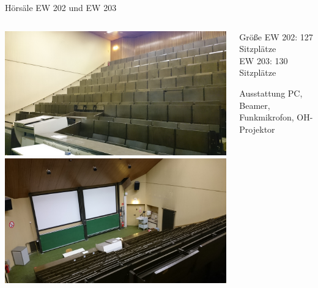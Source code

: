 \documentclass[compress,]{beamer}
\begin{document}
\begin{frame}{Hörsäle EW 202 und EW 203}
  \begin{columns}[onlytextwidth]
    \begin{column}{0.5\textwidth}
      \includegraphics[scale=0.04]{images/DSC_0714.JPG}\\
      \includegraphics[scale=0.04]{images/DSC_0713.JPG}
    \end{column}
    \begin{column}{0.4\textwidth}
      \begin{block}{Größe}
        EW 202: 127 Sitzplätze\\
        EW 203: 130 Sitzplätze
      \end{block}
      \vspace{1cm}
      \begin{block}{Ausstattung}
        PC, Beamer, Funkmikrofon, OH-Projektor
      \end{block}
    \end{column}
  \end{columns}
\end{frame}
\end{document}
